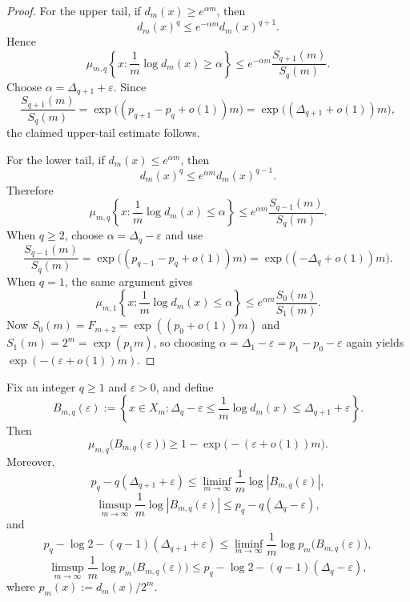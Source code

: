 \begin{proof}
For the upper tail, if \(d_m(x)\ge e^{\alpha m}\), then
\[
  d_m(x)^q\le e^{-\alpha m}d_m(x)^{q+1}.
\]
Hence
\[
  \mu_{m,q}\!\left\{
    x:\frac1m\log d_m(x)\ge \alpha
  \right\}
  \le
  e^{-\alpha m}\frac{S_{q+1}(m)}{S_q(m)}.
\]
Choose \(\alpha=\Delta_{q+1}+\varepsilon\).  Since
\[
  \frac{S_{q+1}(m)}{S_q(m)}=\exp\bigl((p_{q+1}-p_q+o(1))m\bigr)
  =
  \exp\bigl((\Delta_{q+1}+o(1))m\bigr),
\]
the claimed upper-tail estimate follows.

For the lower tail, if \(d_m(x)\le e^{\alpha m}\), then
\[
  d_m(x)^q\le e^{\alpha m}d_m(x)^{q-1}.
\]
Therefore
\[
  \mu_{m,q}\!\left\{
    x:\frac1m\log d_m(x)\le \alpha
  \right\}
  \le
  e^{\alpha m}\frac{S_{q-1}(m)}{S_q(m)}.
\]
When \(q\ge 2\), choose \(\alpha=\Delta_q-\varepsilon\) and use
\[
  \frac{S_{q-1}(m)}{S_q(m)}
  =
  \exp\bigl((p_{q-1}-p_q+o(1))m\bigr)
  =
  \exp\bigl((-\Delta_q+o(1))m\bigr).
\]
When \(q=1\), the same argument gives
\[
  \mu_{m,1}\!\left\{
    x:\frac1m\log d_m(x)\le \alpha
  \right\}
  \le
  e^{\alpha m}\frac{S_0(m)}{S_1(m)}.
\]
Now \(S_0(m)=F_{m+2}=\exp((p_0+o(1))m)\) and \(S_1(m)=2^m=\exp(p_1m)\), so
choosing \(\alpha=\Delta_1-\varepsilon=p_1-p_0-\varepsilon\) again yields
\(\exp(-(\varepsilon+o(1))m)\).
\end{proof}

\begin{theorem}
\label{thm:microcanonical-bands}
Fix an integer \(q\ge 1\) and \(\varepsilon>0\), and define
\[
  B_{m,q}(\varepsilon)
  :=
  \left\{
    x\in X_m:
    \Delta_q-\varepsilon\le \frac1m\log d_m(x)\le \Delta_{q+1}+\varepsilon
  \right\}.
\]
Then
\[
  \mu_{m,q}\bigl(B_{m,q}(\varepsilon)\bigr)
  \ge
  1-\exp\bigl(-(\varepsilon+o(1))m\bigr).
\]
Moreover,
\[
  p_q-q(\Delta_{q+1}+\varepsilon)
  \le
  \liminf_{m\to\infty}\frac1m\log |B_{m,q}(\varepsilon)|,
\]
\[
  \limsup_{m\to\infty}\frac1m\log |B_{m,q}(\varepsilon)|
  \le
  p_q-q(\Delta_q-\varepsilon),
\]
and
\[
  p_q-\log 2-(q-1)(\Delta_{q+1}+\varepsilon)
  \le
  \liminf_{m\to\infty}\frac1m\log p_m\bigl(B_{m,q}(\varepsilon)\bigr),
\]
\[
  \limsup_{m\to\infty}\frac1m\log p_m\bigl(B_{m,q}(\varepsilon)\bigr)
  \le
  p_q-\log 2-(q-1)(\Delta_q-\varepsilon),
\]
where \(p_m(x):=d_m(x)/2^m\).
\end{theorem}

